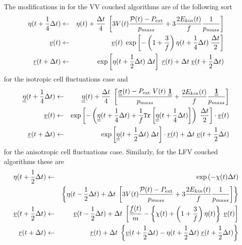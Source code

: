 The modifications in for the VV couched algorithms
are of the following sort
\begin{eqnarray}
\eta (t + {1 \over 4} \Delta t) &\leftarrow& \eta (t) + {\Delta t \over 4} \;
\left[ 3 V(t) \frac{{\cal P}(t) - P_{\rm ext}}{p_{mass}} +
3 \frac{2 E_{kin}(t)}{f} \frac{1}{p_{mass}} \right] \nonumber \\
\mbox{$\underline{v}$}(t) &\leftarrow& \mbox{$\underline{v}$}(t) \; \exp \left[ -\left( 1 + \frac{3}{f} \right)
\eta (t + {1 \over 4}\Delta t) \; {\Delta t \over 2} \right] \\
\mbox{$\underline{r}$}(t + \Delta t) &\leftarrow& \exp \left[ \eta (t + {1 \over 2} \Delta t) \; \Delta t \right] \;
\mbox{$\underline{r}$}(t) + \Delta t \; \mbox{$\underline{v}$}(t + {1 \over 2} \Delta t) \nonumber
\end{eqnarray}
for the isotropic cell fluctuations case and
\begin{eqnarray}
\mbox{$\underline{\underline{\bf \eta}}$}(t + {1 \over 4} \Delta t) &\leftarrow& \mbox{$\underline{\underline{\bf \eta}}$}(t) +
{\Delta t \over 4} \; \left[ \frac{\mbox{$\underline{\underline{\bf \sigma}}$}(t) - P_{\rm ext}~V(t)~\mbox{$\underline{\underline{\bf 1}}$}}{p_{mass}} +
\frac{2 E_{kin}(t)}{f} \frac{\mbox{$\underline{\underline{\bf 1}}$}}{p_{mass}} \right] \nonumber \\
\mbox{$\underline{v}$}(t) &\leftarrow& \exp \left[ -\left( \mbox{$\underline{\underline{\bf \eta}}$}(t + {1 \over 4}\Delta t) +
\frac{1}{f} {\tt Tr}\left[\mbox{$\underline{\underline{\bf \eta}}$}(t + {1 \over 4}\Delta t)\right] \right) \;
{\Delta t \over 2} \right] \cdot \mbox{$\underline{v}$}(t) \\
\mbox{$\underline{r}$}(t + \Delta t) &\leftarrow& \exp \left[ \mbox{$\underline{\underline{\bf \eta}}$} (t + {1 \over 2} \Delta t) \; \Delta t \right] \cdot
\mbox{$\underline{r}$}(t) + \Delta t \; \mbox{$\underline{v}$}(t + {1 \over 2} \Delta t) \nonumber
\end{eqnarray}
for the anisotropic cell fluctuations case.  Similarly, for the LFV
couched algorithms these are
\begin{eqnarray}
\eta (t + {1 \over 2} \Delta t) &\leftarrow& \exp \left( -\chi (t) \Delta t \right) \nonumber \\
&& \left\{ \eta (t - {1 \over 2} \Delta t) + \Delta t \;
\left[ 3 V(t) \frac{{\cal P}(t) - P_{\rm ext}}{p_{mass}} +
3 \frac{2 E_{kin}(t)}{f} \frac{1}{p_{mass}} \right] \right\} \nonumber \\
\mbox{$\underline{v}$}(t + {1 \over 2} \Delta t) &\leftarrow& \mbox{$\underline{v}$}(t - {1 \over 2} \Delta t) + \Delta t \;
\left[{\mbox{$\underline{f}$}(t) \over m} - \left\{ \chi (t) + \left( 1 + \frac{3}{f} \right)\eta (t)\right\} \;
\mbox{$\underline{v}$}(t) \right] \\
\mbox{$\underline{r}$}(t + \Delta t) &\leftarrow& \mbox{$\underline{r}$}(t) + \Delta t \;
\left\{ \mbox{$\underline{v}$}(t + {1 \over 2} \Delta t) - \eta (t + {1 \over 2} \Delta t) \;
\mbox{$\underline{r}$}(t + {1 \over 2} \Delta t) \right\} \nonumber
\end{eqnarray}
